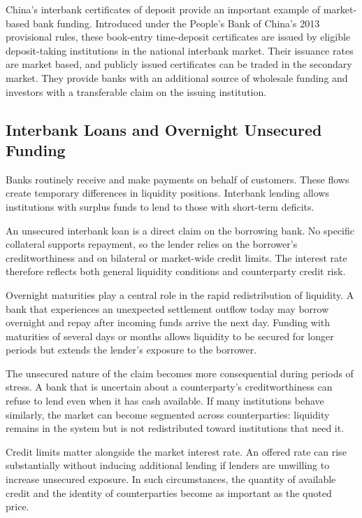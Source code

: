 China's interbank certificates of deposit provide an
important example of market-based bank funding.
Introduced under the People's Bank of China's
2013 provisional rules, these book-entry time-deposit
certificates are issued by eligible deposit-taking
institutions in the national interbank market.
Their issuance rates are market based, and publicly
issued certificates can be traded in the secondary
market. They provide banks with an additional source
of wholesale funding and investors with a transferable
claim on the issuing institution.

\subsection{Interbank Loans and Overnight Unsecured Funding}

Banks routinely receive and make payments on behalf of customers. These flows create temporary differences in liquidity positions. Interbank lending allows institutions with surplus funds to lend to those with short-term deficits.

An unsecured interbank loan is a direct claim on the borrowing bank. No specific collateral supports repayment, so the lender relies on the borrower's creditworthiness and on bilateral or market-wide credit limits. The interest rate therefore reflects both general liquidity conditions and counterparty credit risk.

Overnight maturities play a central role in the rapid
redistribution of liquidity. A bank that experiences
an unexpected settlement outflow today may borrow
overnight and repay after incoming funds arrive the
next day. Funding with maturities of several days or
months allows liquidity to be secured for longer
periods but extends the lender's exposure to the
borrower.

The unsecured nature of the claim becomes more
consequential during periods of stress. A bank that
is uncertain about a counterparty's creditworthiness
can refuse to lend even when it has cash available.
If many institutions behave similarly, the market
can become segmented across counterparties: liquidity
remains in the system but is not redistributed toward
institutions that need it.

Credit limits matter alongside the market interest rate. An offered rate can rise substantially without inducing additional lending if lenders are unwilling to increase unsecured exposure. In such circumstances, the quantity of available credit and the identity of counterparties become as important as the quoted price.

